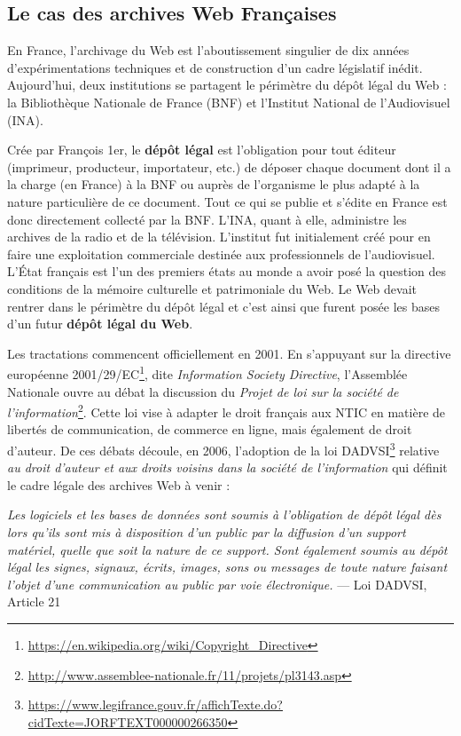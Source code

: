 \documentclass[symmetric,justified,marginals=raggedouter]{tufte-book}
\begin{document}
\subsection{Le cas des archives Web Françaises}

\noindent En France, l'archivage du Web est l'aboutissement singulier de dix années d'expérimentations techniques et de construction d'un cadre législatif inédit. Aujourd'hui, deux institutions se partagent le périmètre du dépôt légal du Web : la Bibliothèque Nationale de France (BNF) et l'Institut National de l'Audiovisuel (INA). 

Crée par François 1er, le \textbf{dépôt légal} est l'obligation pour tout éditeur (imprimeur, producteur, importateur, etc.) de déposer chaque document dont il a la charge (en France) à la BNF ou auprès de l'organisme le plus adapté à la nature particulière de ce document. Tout ce qui se publie et s'édite en France est donc directement collecté par la BNF. L'INA, quant à elle, administre les archives de la radio et de la télévision. L'institut fut initialement créé pour en faire une exploitation commerciale destinée aux professionnels de l'audiovisuel. L'État français est l'un des premiers états au monde a avoir posé la question des conditions de la mémoire culturelle et patrimoniale du Web. Le Web devait rentrer dans le périmètre du dépôt légal et c'est ainsi que furent posée les bases d'un futur \textbf{dépôt légal du Web}.

Les tractations commencent officiellement en 2001. En s'appuyant sur la directive européenne 2001/29/EC\footnote{\RaggedOuter \url{https://en.wikipedia.org/wiki/Copyright\_Directive}}, dite \textit{Information Society Directive}, l'Assemblée Nationale ouvre au débat la discussion du \textit{Projet de loi sur la société de l'information}\footnote{\RaggedOuter \url{http://www.assemblee-nationale.fr/11/projets/pl3143.asp}}. Cette loi vise à adapter le droit français aux NTIC en matière de libertés de communication, de commerce en ligne, mais également de droit d'auteur. De ces débats découle, en 2006, l'adoption de la loi DADVSI\footnote{\RaggedOuter \url{https://www.legifrance.gouv.fr/affichTexte.do?cidTexte=JORFTEXT000000266350}} relative \textit{au droit d'auteur et aux droits voisins dans la société de l'information} qui définit le cadre légale des archives Web à venir :\\

\begin{fullwidth}

\og\textit{Les logiciels et les bases de données sont soumis à l’obligation de dépôt légal dès lors qu’ils sont mis à disposition d’un public par la diffusion d’un support matériel, quelle que soit la nature de ce support. Sont également soumis au dépôt légal les signes, signaux, écrits, images, sons ou messages de toute nature faisant l’objet d’une communication au public par voie électronique.}\fg{} --- Loi DADVSI, Article 21\\

\end{fullwidth}
\end{document}

